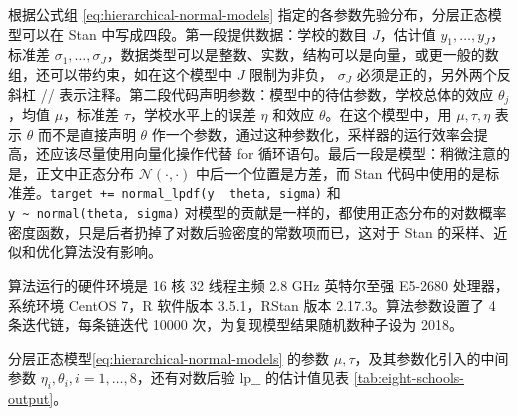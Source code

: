\documentclass[12pt,a4paper,UTF8,twoside]{book}
\theoremstyle{definition}
\theoremstyle{definition}
\theoremstyle{definition}
\theoremstyle{remark}
\begin{document}
根据公式组 \eqref{eq:hierarchical-normal-models} 指定的各参数先验分布，分层正态模型可以在 Stan 中写成四段。第一段提供数据：学校的数目 \(J\)，估计值 \(y_1,\ldots,y_{J}\)，标准差 \(\sigma_1,\ldots,\sigma_{J}\)，数据类型可以是整数、实数，结构可以是向量，或更一般的数组，还可以带约束，如在这个模型中 \(J\) 限制为非负， \(\sigma_{J}\) 必须是正的，另外两个反斜杠 // 表示注释。第二段代码声明参数：模型中的待估参数，学校总体的效应 \(\theta_j\)，均值 \(\mu\)，标准差 \(\tau\)，学校水平上的误差 \(\eta\) 和效应 \(\theta\)。在这个模型中，用 \(\mu,\tau,\eta\) 表示 \(\theta\) 而不是直接声明 \(\theta\) 作一个参数，通过这种参数化，采样器的运行效率会提高，还应该尽量使用向量化操作代替 for 循环语句。最后一段是模型：稍微注意的是，正文中正态分布 \(\mathcal{N}(\cdot,\cdot)\) 中后一个位置是方差，而 Stan 代码中使用的是标准差。\texttt{target\ +=\ normal\_lpdf(y\ \textbar{}\ theta,\ sigma)} 和 \texttt{y\ \textasciitilde{}\ normal(theta,\ sigma)} 对模型的贡献是一样的，都使用正态分布的对数概率密度函数，只是后者扔掉了对数后验密度的常数项而已，这对于 Stan 的采样、近似和优化算法没有影响。

算法运行的硬件环境是 16 核 32 线程主频 2.8 GHz 英特尔至强 E5-2680 处理器，系统环境 CentOS 7，R 软件版本 3.5.1，RStan 版本 2.17.3。算法参数设置了 4 条迭代链，每条链迭代 10000 次，为复现模型结果随机数种子设为 2018。

分层正态模型\eqref{eq:hierarchical-normal-models} 的参数 \(\mu,\tau\)，及其参数化引入的中间参数 \(\eta_i,\theta_i,i=1,\ldots,8\)，还有对数后验 \(\mathrm{lp}\_\_\) 的估计值见表 \ref{tab:eight-schools-output}。
\end{document}
